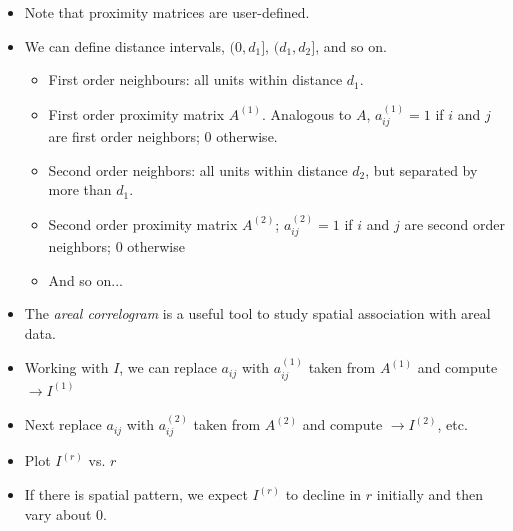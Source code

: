 \documentclass[10pt]{beamer}
\begin{document}
\begin{frame}
 
\begin{itemize}\setlength{\itemsep}{0.5cm}

\item Note that proximity matrices are user-defined.

\item We can define distance intervals, $(0, d_1]$, $(d_1, d_2]$, and so on.

\begin{itemize}\setlength{\itemsep}{0.3cm}
 \item First order neighbours: all units within distance $d_1$. 

 \item First order proximity matrix $A^{(1)}$. Analogous to $A$, $a_{ij}^{(1)}=1$ if $i$ and $j$ are first order neighbors; $0$ otherwise.
 
\item Second order neighbors: all units within distance $d_2$, but separated by more than $d_1$. 

\item Second order proximity matrix $A^{(2)}$; $a_{ij}^{(2)}=1$ if $i$ and $j$ are second order neighbors; $0$ otherwise
 \item And so on... 
\end{itemize}

\end{itemize}

\end{frame}


\begin{frame}
 \begin{itemize}\setlength{\itemsep}{0.5cm}

\item The \emph{areal correlogram} is a useful tool to study spatial association with areal data.

\item Working with $I$, we can replace $a_{ij}$ with $a_{ij}^{(1)}$ taken from $A^{(1)}$ and compute
$\rightarrow I^{(1)}$

\item Next replace  $a_{ij}$ with $a_{ij}^{(2)}$ taken from $A^{(2)}$ and compute
$\rightarrow I^{(2)}$, etc.

\item Plot $I^{(r)}$ vs. $r$

\item If there is spatial pattern, we expect $I^{(r)}$ to decline in $r$ initially and then vary about 0.
\end{itemize}
\end{frame}
\end{document}
